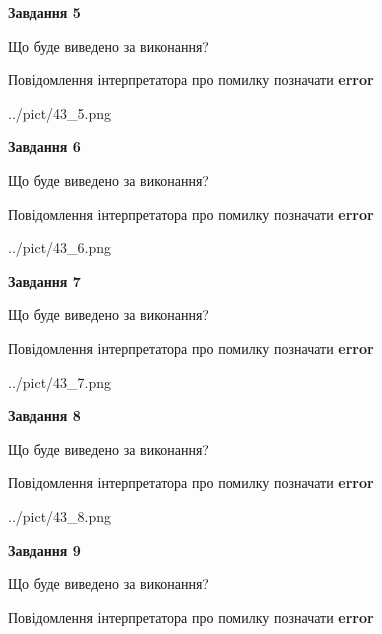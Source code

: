\documentclass[11pt, ukrainian]{article}
\begin{document}
{\begin {large}
{\begin {center}\textbf{Завдання 5}\end {center}}\par
Що буде виведено за виконання? \par
Повідомлення інтерпретатора про помилку позначати \textbf{error}

\begin{center}
	{../pict/43_5.png}
\end{center}
\newpage

{\begin {center}\textbf{Завдання 6}\end {center}}\par
Що буде виведено за виконання? \par
Повідомлення інтерпретатора про помилку позначати \textbf{error}

\begin{center}
	{../pict/43_6.png}
\end{center}
\newpage

{\begin {center}\textbf{Завдання 7}\end {center}}\par
Що буде виведено за виконання? \par
Повідомлення інтерпретатора про помилку позначати \textbf{error}

\begin{center}
	{../pict/43_7.png}
\end{center}
\newpage

{\begin {center}\textbf{Завдання 8}\end {center}}\par
Що буде виведено за виконання? \par
Повідомлення інтерпретатора про помилку позначати \textbf{error}

\begin{center}
	{../pict/43_8.png}
\end{center}
\newpage

{\begin {center}\textbf{Завдання 9}\end {center}}\par
Що буде виведено за виконання? \par
Повідомлення інтерпретатора про помилку позначати \textbf{error}


\end{large}}
\end{document}
